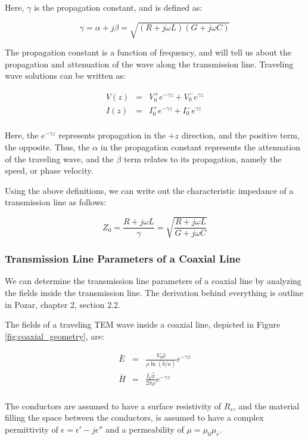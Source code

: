 \documentclass[12pt,onecolumn,titlepage]{article}
\begin{document}
Here, $\gamma$ is the propagation constant, and is defined as: 

\[ \gamma = \alpha + j \beta = \sqrt{ \left( R + j \omega L \right) \left( G + j \omega C \right) } \]

The propagation constant is a function of frequency, and will tell us about the propagation and attenuation of the wave along the transmission line. Traveling wave solutions can be written as:

\begin{eqnarray}
V(z) &=& V_0^+ e^{-\gamma z} + V_0^- e^{\gamma z} \\
I(z) &=& I_0^+ e^{-\gamma z} + I_0^- e^{\gamma z} \\
\end{eqnarray}

Here, the $e^{-\gamma z}$ represents propagation in the $+z$ direction, and the positive term, the opposite. Thus, the $\alpha$ in the propagation constant represents the attenuation of the traveling wave, and the $\beta$ term relates to its propagation, namely the speed, or phase velocity.

Using the above definitions, we can write out the characteristic impedance of a transmission line as follows:

\[ Z_0 = \frac{R + j \omega L}{\gamma} = \sqrt{ \frac{R + j \omega L}{G + j \omega C} } \]


\subsubsection{Transmission Line Parameters of a Coaxial Line}
\indent \indent We can determine the transmission line parameters of a coaxial line by analyzing the fields inside the transmission line. The derivation behind everything is outline in Pozar, chapter 2, section 2.2.

The fields of a traveling TEM wave inside a coaxial line, depicted in Figure \ref{fig:coaxial_geometry}, are:

\begin{eqnarray}
\bar{E} &=& \frac{V_0 \hat{\rho}}{\rho \ln \left( b/a \right)} e^{-\gamma z} \\
\bar{H} &=& \frac{I_0 \hat{\phi}}{2 \pi \rho} e^{-\gamma z} \\
\end{eqnarray}

The conductors are assumed to have a surface resistivity of $R_s$, and the material filling the space between the conductors, is assumed to have a complex permittivity of $\epsilon = \epsilon' - j \epsilon''$ and a permeability of $\mu = \mu_0 \mu_r$.
\end{document}
